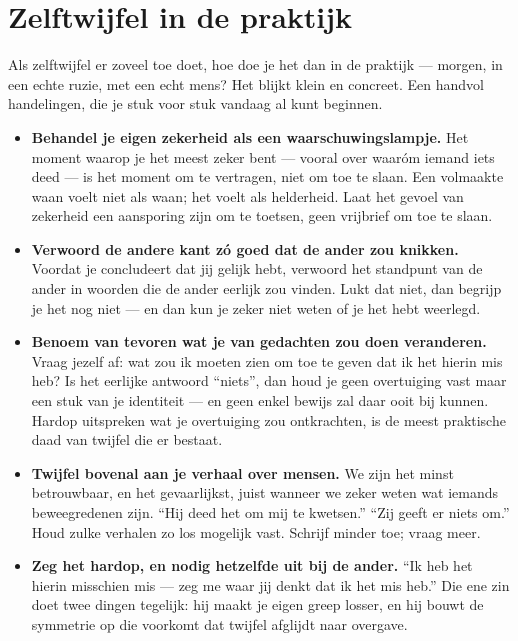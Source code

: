 \documentclass{article}
\begin{document}
\section*{Zelftwijfel in de praktijk}

Als zelftwijfel er zoveel toe doet, hoe doe je het dan in de praktijk --- morgen, in een echte ruzie, met een echt mens? Het blijkt klein en concreet. Een handvol handelingen, die je stuk voor stuk vandaag al kunt beginnen.

\begin{itemize}
    \item \textbf{Behandel je eigen zekerheid als een waarschuwingslampje.} Het moment waarop je het meest zeker bent --- vooral over waaróm iemand iets deed --- is het moment om te vertragen, niet om toe te slaan. Een volmaakte waan voelt niet als waan; het voelt als helderheid. Laat het gevoel van zekerheid een aansporing zijn om te toetsen, geen vrijbrief om toe te slaan.

    \item \textbf{Verwoord de andere kant zó goed dat de ander zou knikken.} Voordat je concludeert dat jij gelijk hebt, verwoord het standpunt van de ander in woorden die de ander eerlijk zou vinden. Lukt dat niet, dan begrijp je het nog niet --- en dan kun je zeker niet weten of je het hebt weerlegd.

    \item \textbf{Benoem van tevoren wat je van gedachten zou doen veranderen.} Vraag jezelf af: wat zou ik moeten zien om toe te geven dat ik het hierin mis heb? Is het eerlijke antwoord \enquote{niets}, dan houd je geen overtuiging vast maar een stuk van je identiteit --- en geen enkel bewijs zal daar ooit bij kunnen. Hardop uitspreken wat je overtuiging zou ontkrachten, is de meest praktische daad van twijfel die er bestaat.

    \item \textbf{Twijfel bovenal aan je verhaal over mensen.} We zijn het minst betrouwbaar, en het gevaarlijkst, juist wanneer we zeker weten wat iemands beweegredenen zijn. \enquote{Hij deed het om mij te kwetsen.} \enquote{Zij geeft er niets om.} Houd zulke verhalen zo los mogelijk vast. Schrijf minder toe; vraag meer.

    \item \textbf{Zeg het hardop, en nodig hetzelfde uit bij de ander.} \enquote{Ik heb het hierin misschien mis --- zeg me waar jij denkt dat ik het mis heb.} Die ene zin doet twee dingen tegelijk: hij maakt je eigen greep losser, en hij bouwt de symmetrie op die voorkomt dat twijfel afglijdt naar overgave.
\end{itemize}
\end{document}
